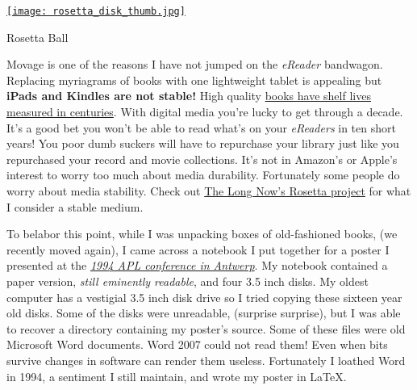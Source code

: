 \captionsetup[floatingfigure]{labelformat=empty}
\begin{floatingfigure}[l]{0.25\textwidth}
\centering
\href{http://blog.longnow.org/2008/08/20/very-long-term-backup/}{\texttt{[image: rosetta\_disk\_thumb.jpg]}}
\caption{Rosetta  Ball}
\label{fig:903X0}
\end{floatingfigure}Movage is one of the reasons I have not jumped on the
\emph{eReader} bandwagon. Replacing myriagrams of books with one
lightweight tablet is appealing but \textbf{iPads and Kindles are not
stable!} High quality
\href{http://news.bbc.co.uk/2/hi/entertainment/3696333.stm}{books have
shelf lives measured in centuries}. With digital media you're lucky to
get through a decade. It's a good bet you won't be able to read what's
on your \emph{eReaders} in ten short years! You poor dumb suckers will
have to repurchase your library just like you repurchased your record
and movie collections. It's not in Amazon's or Apple's interest to worry
too much about media durability. Fortunately some people do worry about
media stability. Check out
\href{http://www.rosettaproject.org/disk/concept/}{The Long Now's
Rosetta project} for what I consider a stable medium.

To belabor this point, while I was unpacking boxes of old-fashioned
books, (we recently moved again), I came across a notebook I put
together for a poster I presented at the
\href{https://dl.acm.org/doi/proceedings/10.1145/190271}{\emph{1994 APL conference in
Antwerp}}. My notebook contained a paper version, \emph{still eminently
readable}, and four 3.5 inch disks. My oldest computer has a vestigial
3.5 inch disk drive so I tried copying these sixteen year old disks.
Some of the disks were unreadable, (surprise surprise), but I was able
to recover a directory containing my poster's source. Some of these
files were old Microsoft Word documents. Word 2007 could not read them!
Even when bits survive changes in software can render them useless.
Fortunately I loathed Word in 1994, a sentiment I still maintain, and
wrote my poster in \LaTeX.

